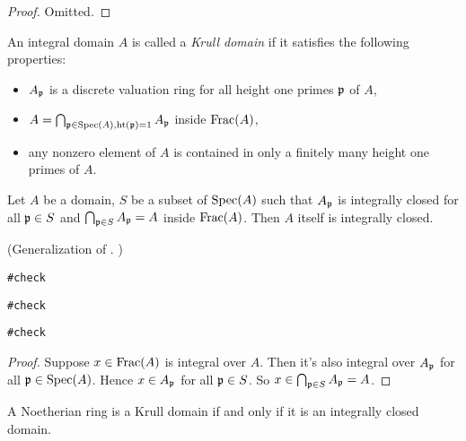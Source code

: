 \begin{proof}
\leanok
Omitted.
\end{proof}

\begin{definition}
\label{krull-domain-defn}
\leanok
An integral domain $A$ is called a \emph{Krull domain}
if it satisfies the following properties:
\begin{itemize}
\item
$A_{\mathfrak{p}}$ is a discrete valuation ring for all height one primes ${\mathfrak{p}}$ of $A$,
\item
$A=\bigcap_{{\mathfrak{p}}\in{\mathrm{Spec}}(A),{\mathrm{ht}}({\mathfrak{p}})=1}A_{\mathfrak{p}}$ inside ${\mathrm{Frac}}(A)$,
\item
any nonzero element of $A$ is contained in only a finitely many height one primes of $A$.
\end{itemize}
\end{definition}


\begin{lem}
\label{integrally-closed-is-local-prop}
Let $A$ be a domain, $S$ be a subset of ${\mathrm{Spec}}(A)$
such that $A_{\mathfrak{p}}$ is integrally closed for all ${\mathfrak{p}}\in S$
and $\bigcap_{{\mathfrak{p}}\in S}A_{\mathfrak{p}}=A$ inside ${\mathrm{Frac}}(A)$.
Then $A$ itself is integrally closed.

(Generalization of . )
\end{lem}

\noindent\verb|#check |

\noindent\verb|#check |

\noindent\verb|#check |

\begin{proof}
Suppose $x\in{\mathrm{Frac}}(A)$ is integral over $A$. Then it's also integral over $A_{\mathfrak{p}}$
for all ${\mathfrak{p}}\in{\mathrm{Spec}}(A)$. Hence $x\in A_{\mathfrak{p}}$ for all ${\mathfrak{p}}\in S$.
So $x\in\bigcap_{{\mathfrak{p}}\in S}A_{\mathfrak{p}}=A$.
\end{proof}

\begin{prop}
\label{noeth-ring-is-krull-domain-iff}
\leanok
{}
A Noetherian ring is a Krull domain if and only if it is an integrally closed domain.
\end{prop}

